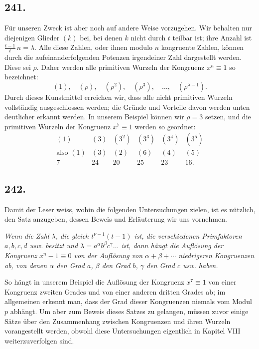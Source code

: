 \documentclass[12pt]{article}
\begin{document}
\subsection*{241.}
Für unseren Zweck ist aber noch auf andere Weise vorzugehen. Wir behalten nur diejenigen Glieder $(k)$ bei, bei denen $k$ nicht durch $t$ teilbar ist; ihre Anzahl ist $\frac{t-1}{t}\,n=\lambda$. Alle diese Zahlen, oder ihnen modulo $n$ kongruente Zahlen, können durch die aufeinanderfolgenden Potenzen irgendeiner Zahl dargestellt werden. Diese sei $\rho$. Daher werden alle primitiven Wurzeln der Kongruenz $x^n\equiv 1$ so bezeichnet:
\[
(1),\quad (\rho),\quad (\rho^2),\quad (\rho^3),\quad \ldots,\quad (\rho^{\lambda-1}).
\]
Durch dieses Kunstmittel erreichen wir, dass alle nicht primitiven Wurzeln vollständig ausgeschlossen werden; die Gründe und Vorteile davon werden unten deutlicher erkannt werden. In unserem Beispiel können wir $\rho=3$ setzen, und die primitiven Wurzeln der Kongruenz $x^7\equiv 1$ werden so geordnet:
\[
\begin{array}{cccccc}
(1)&(3)&(3^2)&(3^3)&(3^4)&(3^5)\\
\text{also }(1)&(3)&(2)&(6)&(4)&(5)\\
7&24&20&25&23&16.
\end{array}
\]

\subsection*{242.}
Damit der Leser weiss, wohin die folgenden Untersuchungen zielen, ist es nützlich, den Satz anzugeben, dessen Beweis und Erläuterung wir uns vornehmen.

\textit{Wenn die Zahl $\lambda$, die gleich $t^{\nu-1}(t-1)$ ist, die verschiedenen Primfaktoren $a,b,c,d$ usw. besitzt und $\lambda=a^\alpha b^\beta c^\gamma\ldots$ ist, dann hängt die Auflösung der Kongruenz $x^n-1\equiv 0$ von der Auflösung von $\alpha+\beta+\cdots$ niedrigeren Kongruenzen ab, von denen $\alpha$ den Grad $a$, $\beta$ den Grad $b$, $\gamma$ den Grad $c$ usw. haben.}

So hängt in unserem Beispiel die Auflösung der Kongruenz $x^7\equiv 1$ von einer Kongruenz zweiten Grades und von einer anderen dritten Grades ab; im allgemeinen erkennt man, dass der Grad dieser Kongruenzen niemals vom Modul $p$ abhängt. Um aber zum Beweis dieses Satzes zu gelangen, müssen zuvor einige Sätze über den Zusammenhang zwischen Kongruenzen und ihren Wurzeln vorangestellt werden, obwohl diese Untersuchungen eigentlich in Kapitel VIII weiterzuverfolgen sind.
\end{document}
